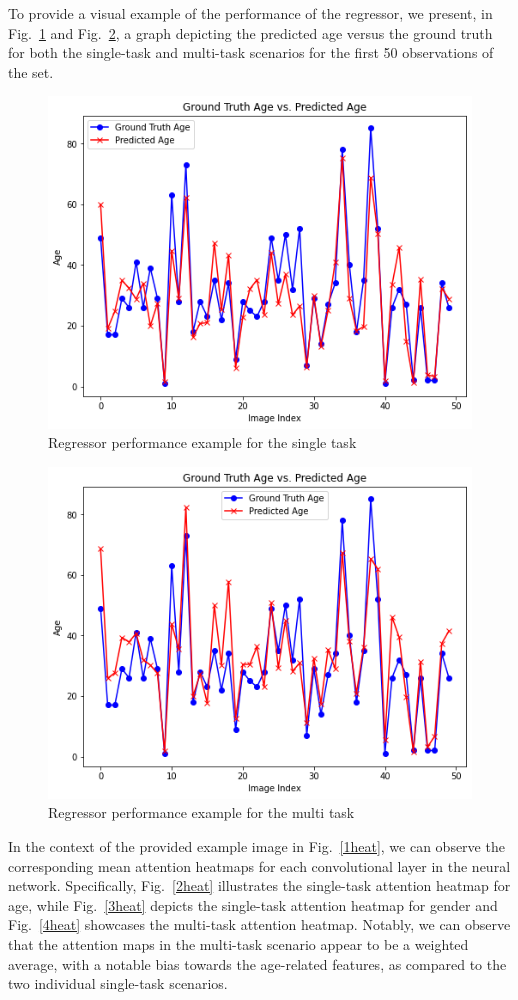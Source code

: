 To provide a visual example of the performance of the regressor,
we present, in Fig.~\ref{8reg} and Fig.~\ref{9reg},
a graph depicting the predicted age versus the ground truth
for both the single-task and multi-task scenarios for the first
50 observations of the set.
\begin{figure}[htbp]
    \centerline{\includegraphics[width=.45\textwidth]{images/testing/reg_single.png}}
    \caption{Regressor performance example for the single task}
    \label{8reg}
\end{figure}
\begin{figure}[htbp]
    \centerline{\includegraphics[width=.45\textwidth]{images/testing/reg_multi.png}}
    \caption{Regressor performance example for the multi task}
    \label{9reg}
\end{figure}

In the context of the provided example image in Fig.~\ref{1heat},
we can observe the corresponding mean attention heatmaps
for each convolutional layer in the neural network.
Specifically, Fig.~\ref{2heat} illustrates the single-task attention
heatmap for age, while Fig.~\ref{3heat} depicts the single-task
attention heatmap for gender and
Fig.~\ref{4heat} showcases the multi-task attention heatmap.
Notably, we can observe that the attention maps in the multi-task
scenario appear to be a weighted average,
with a notable bias towards the age-related features,
as compared to the two individual single-task scenarios.

